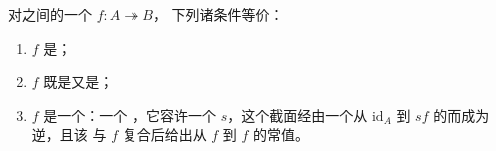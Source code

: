 \begin{proposition}\label{prop:isofibration-characterizations}
对\trQuasiCategory{}之间的一个\trIsofibration{} $f\colon A\twoheadrightarrow B$，
下列诸条件等价：

\begin{enumerate}[label=(\roman*)]
\item $f$ 是\trTrivialFibration；
\item $f$ 既是\trIsofibration{}又是\trEquivalence；
\item $f$ 是一个\textbf{\trSplitFiberHomotopyEquivalence}：一个%
  \trIsofibration，它容许一个\trSection{} $s$，这个截面经由一个从
  $\mathrm{id}_{A}$ 到 $sf$ 的\trHomotopy{}而成为\trEquivalence{}逆，且该%
  \trHomotopy{}与 $f$ 复合后给出从 $f$ 到 $f$ 的常值\trHomotopy。
\end{enumerate}
\end{proposition}

